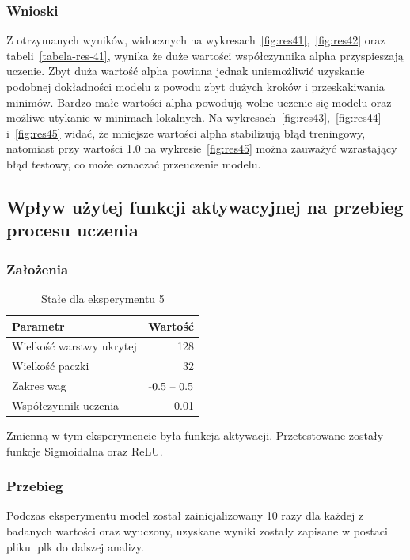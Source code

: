 \documentclass{article}
\begin{document}
\subsubsection*{Wnioski}

Z otrzymanych wyników, widocznych na wykresach~\ref{fig:res41},~\ref{fig:res42} oraz tabeli~\ref{tabela-res-41}, wynika że duże wartości współczynnika alpha przyspieszają uczenie. Zbyt duża wartość alpha powinna jednak uniemożliwić uzyskanie podobnej dokładności modelu z powodu zbyt dużych kroków i przeskakiwania  minimów. Bardzo małe wartości alpha powodują wolne uczenie się modelu oraz możliwe utykanie w minimach lokalnych. Na wykresach~\ref{fig:res43},~\ref{fig:res44} i~\ref{fig:res45} widać, że mniejsze wartości alpha stabilizują błąd treningowy, natomiast przy wartości 1.0 na wykresie~\ref{fig:res45} można zauważyć wzrastający błąd testowy, co może oznaczać przeuczenie modelu.

\newpage
\subsection{Wpływ użytej funkcji aktywacyjnej na przebieg procesu uczenia}
\subsubsection*{Założenia}
\begin{table}[H]
	\caption{Stałe dla eksperymentu 5}
	\label{tabela-const-5}
	\centering
	\begin{tabular}{lr}
		\toprule
		Parametr                   & Wartość         \\
		\midrule
		Wielkość warstwy ukrytej & 128               \\
		Wielkość paczki          & 32                \\
		Zakres wag                 & \($-0.5 -- 0.5$\) \\
		Współczynnik uczenia     & 0.01              \\
		\bottomrule
	\end{tabular}
\end{table}

Zmienną w tym eksperymencie była funkcja aktywacji. Przetestowane zostały funkcje Sigmoidalna oraz ReLU.
\subsubsection*{Przebieg}

Podczas eksperymentu model został zainicjalizowany 10 razy dla każdej z badanych wartości oraz wyuczony, uzyskane wyniki zostały zapisane w postaci pliku .plk do dalszej analizy.
\end{document}
